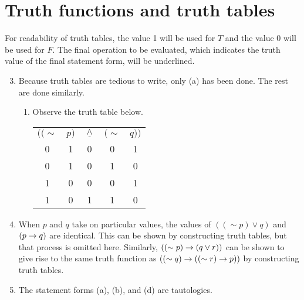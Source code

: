 \section{Truth functions and truth tables}

\note{} For readability of truth tables, the value 1 will be used for \(T\) and the value 0 will be used for \(F\). The final operation to be evaluated, which indicates the truth value of the final statement form, will be underlined.

\solutions{}
\begin{enumerate}
  \setcounter{enumi}{2}
  \item %
    Because truth tables are tedious to write, only (a) has been done. The rest are done similarly.
    \begin{enumerate}[(\alph*), align=left]
      \item Observe the truth table below.
        \begin{center}
          \begin{tabular}{ccccc}
            \(((\sim\)&
            \(p)\)&
            \(\underline{\wedge}\)&
            \((\sim\)&
            \(q))\)\\

            0&
            1&
            0&
            0&
            1\\

            0&
            1&
            0&
            1&
            0\\

            1&
            0&
            0&
            0&
            1\\

            1&
            0&
            1&
            1&
            0
          \end{tabular}
        \end{center}
    \end{enumerate}

  \item %
    When \(p\) and \(q\) take on particular values, the values of \(((\sim p) \lor q)\) and \((p \rightarrow q)\) are identical. This can be shown by constructing truth tables, but that process is omitted here. Similarly, \(((\sim p) \rightarrow (q \lor r))\) can be shown to give rise to the same truth function as \(((\sim q) \rightarrow ((\sim r) \rightarrow p))\) by constructing truth tables.

  \item %
    The statement forms (a), (b), and (d) are tautologies.


\end{enumerate}
